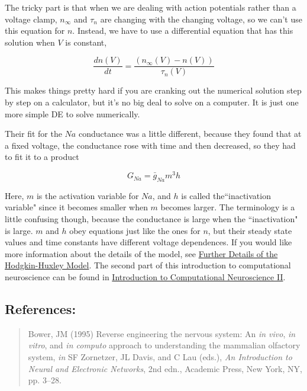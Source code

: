 \documentclass[12pt]{article}
\begin{document}
The tricky part is that when we are dealing with action potentials rather than a voltage clamp, $n_\infty$ and $\tau_n$ are changing with the changing voltage, so we can't use this equation for $n$. Instead, we have to use a differential equation that has this solution when $V$ is constant,

\begin{equation}
		\frac{dn(V)}{dt} = \frac{(n_\infty(V) - n(V))}{\tau_n(V)}
\label{eq:eq4}	
\end{equation}

This makes things pretty hard if you are cranking out the numerical solution step by step on a calculator, but it's no big deal to solve on a computer. It is just one more simple DE to solve numerically.

Their fit for the $Na$ conductance was a little different, because they found that at a fixed voltage, the conductance rose with time and then decreased, so they had to fit it to a product

\begin{equation}
		G_{Na} = \bar{g}_{Na}m^{3}h
\label{eq:eq5}		
\end{equation}

Here, $m$ is the activation variable for $Na$, and $h$ is called the``inactivation variable" since it becomes smaller when $m$ becomes larger. The terminology is a little confusing though, because the conductance is large when the ``inactivation" is large. $m$ and $h$ obey equations just like the ones for $n$, but their steady state values and time constants have different voltage dependences. If you would like more information about the details of the model, see \href{../hh-model-details/hh-model-details.tex}{Further Details of the Hodgkin-Huxley Model}. The second part of this introduction to computational neuroscience can be found in  \href{../compneurosci-2/compneurosci-2.tex}{Introduction to Computational Neuroscience II}.

\subsection*{References:}

\begin{quote}

Bower, JM (1995) Reverse engineering the nervous system: An {\it in vivo}, {\it in vitro}, and {\it in computo} approach to understanding the mammalian olfactory system, {\it in} SF Zornetzer, JL Davis, and C Lau (eds.), {\it An Introduction to Neural and Electronic Networks}, 2nd edn., Academic Press, New York, NY, pp. 3--28.

\end{quote}
\end{document}
